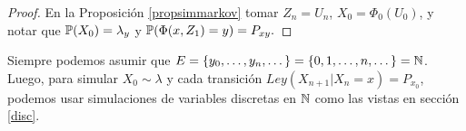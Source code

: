 \begin{proof}
\gris
En la Proposición \ref{propsimmarkov} tomar $Z_n=U_n$, $X_0=\Phi_0(U_0)$, y notar que $\P(X_0)=\lambda_y$ y $\P(\Phi(x,Z_1)=y)=P_{xy}.$ \findem
\negro
\end{proof}
\begin{remark}
Siempre podemos asumir que $E=\{y_0,\dots,y_n,\dots\} = \{0,1,\dots,n,\dots\}=\N$.
\newline Luego, para simular $X_0\sim\lambda$ y cada transición $Ley(X_{n+1}|X_n=x)=P_{x_0}$, podemos usar simulaciones de variables discretas en $\N$ como las vistas en sección \ref{disc}.
\end{remark}
